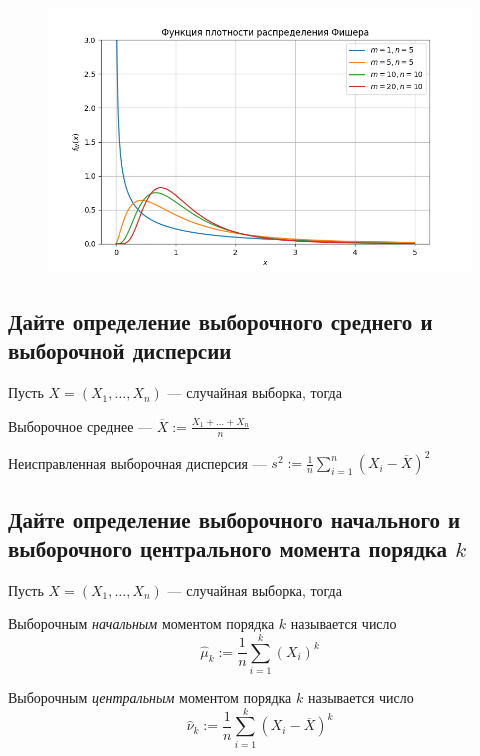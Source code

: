 \documentclass{article}
\begin{document}
\begin{figure}[h]
    \centering
    \includegraphics[width=0.8\linewidth]{fisher.png}
\end{figure}

\subsection{Дайте определение выборочного среднего и выборочной дисперсии}
Пусть $X=(X_1,\ldots,X_n)$ — случайная выборка, тогда

 Выборочное среднее — $\overline{X}:=\displaystyle\frac{X_1+\ldots+X_n}{n}$

 Неисправленная выборочная дисперсия — $s^2:=\displaystyle\frac{1}{n}\sum_{i=1}^n (X_i-\overline{X})^2$



\subsection{Дайте определение выборочного начального и выборочного центрального момента порядка $k$}
Пусть $X=(X_1,\ldots,X_n)$ — случайная выборка, тогда 

 Выборочным \textit{начальным} моментом порядка $k$ называется число 
\begin{equation*}
    \widehat{\mu}_k:=\frac{1}{n}\sum_{i=1}^{k}(X_i)^k
\end{equation*}

 Выборочным \textit{центральным} моментом порядка $k$ называется число
\begin{equation*}
    \widehat{\nu}_k:=\frac{1}{n}\sum_{i=1}^{k}(X_i-\overline{X})^k
\end{equation*}
\end{document}
